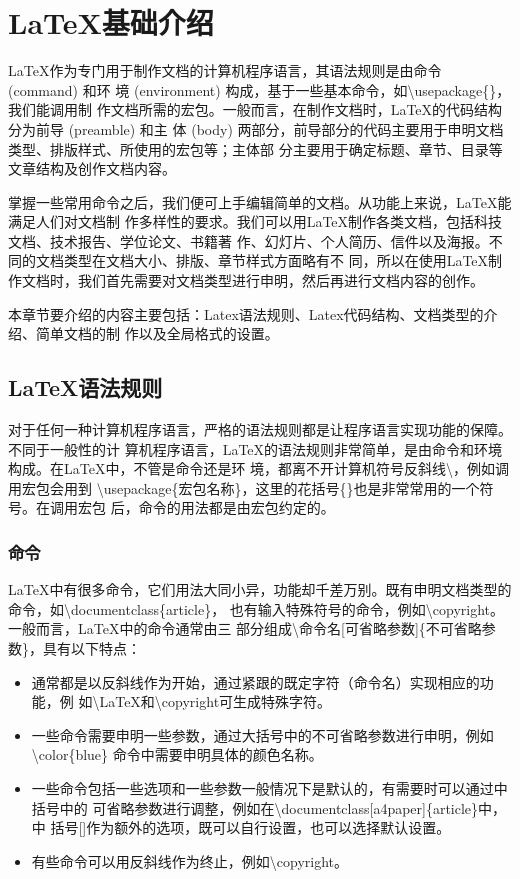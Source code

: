 \chapter{\LaTeX 基础介绍}
LaTeX作为专门用于制作文档的计算机程序语言，其语法规则是由命令 (command) 和环
境 (environment) 构成，基于一些基本命令，如\textbackslash usepackage\{\}，我们能调用制
作文档所需的宏包。一般而言，在制作文档时，LaTeX的代码结构分为前导 (preamble) 和主
体 (body) 两部分，前导部分的代码主要用于申明文档类型、排版样式、所使用的宏包等；主体部
分主要用于确定标题、章节、目录等文章结构及创作文档内容。

掌握一些常用命令之后，我们便可上手编辑简单的文档。从功能上来说，LaTeX能满足人们对文档制
作多样性的要求。我们可以用LaTeX制作各类文档，包括科技文档、技术报告、学位论文、书籍著
作、幻灯片、个人简历、信件以及海报。不同的文档类型在文档大小、排版、章节样式方面略有不
同，所以在使用LaTeX制作文档时，我们首先需要对文档类型进行申明，然后再进行文档内容的创作。

本章节要介绍的内容主要包括：Latex语法规则、Latex代码结构、文档类型的介绍、简单文档的制
作以及全局格式的设置。

\section{\LaTeX 语法规则}
对于任何一种计算机程序语言，严格的语法规则都是让程序语言实现功能的保障。不同于一般性的计
算机程序语言，LaTeX的语法规则非常简单，是由命令和环境构成。在LaTeX中，不管是命令还是环
境，都离不开计算机符号反斜线\textbackslash，例如调用宏包会用到
\textbackslash usepackage\{宏包名称\}，这里的花括号\{\}也是非常常用的一个符号。在调用宏包
后，命令的用法都是由宏包约定的。

\subsection{命令}
LaTeX中有很多命令，它们用法大同小异，功能却千差万别。既有申明文档类型的命令，如\textbackslash documentclass\{article\}，
也有输入特殊符号的命令，例如\textbackslash copyright。一般而言，LaTeX中的命令通常由三
部分组成\textbackslash 命令名[可省略参数]\{不可省略参数\}，具有以下特点：
\begin{itemize}
    \item 通常都是以反斜线作为开始，通过紧跟的既定字符（命令名）实现相应的功能，例
          如\textbackslash LaTeX和\textbackslash copyright可生成特殊字符。
    \item 一些命令需要申明一些参数，通过大括号中的不可省略参数进行申明，例如\textbackslash color\{blue\}
          命令中需要申明具体的颜色名称。
    \item 一些命令包括一些选项和一些参数一般情况下是默认的，有需要时可以通过中括号中的
          可省略参数进行调整，例如在\textbackslash documentclass[a4paper]\{article\}中，中
          括号[]作为额外的选项，既可以自行设置，也可以选择默认设置。
    \item 有些命令可以用反斜线作为终止，例如\textbackslash copyright。
\end{itemize}

